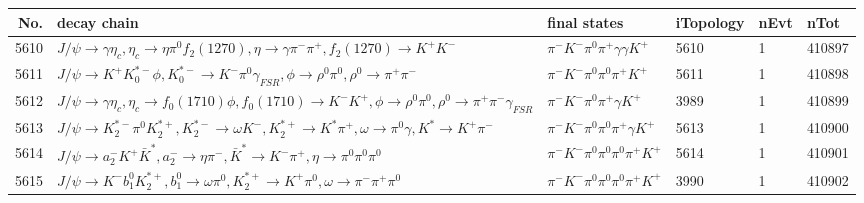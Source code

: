\begin{table}[htbp] 
\begin{center}
\begin{small}
\begin{tabular}{rlllll}\hline\hline
 No. & decay chain & final states &  iTopology & nEvt & nTot \\\hline
5610&$J/\psi       \rightarrow \gamma       \eta_{c}    , \eta_{c}     \rightarrow \eta          \pi^{0}        f_{2}(1270)    , \eta           \rightarrow \gamma       \pi^{-}        \pi^{+}        , f_{2}(1270)     \rightarrow K^{+}          K^{-}          $&$\pi^{-}        K^{-}          \pi^{0}        \pi^{+}        \gamma       \gamma       K^{+}          $& 5610&    1&410897\\
5611&$J/\psi       \rightarrow K^{+}          K_{0}^{*-}     \phi           , K_{0}^{*-}      \rightarrow K^{-}          \pi^{0}        \gamma_{FSR} , \phi            \rightarrow \rho^{0}      \pi^{0}        , \rho^{0}       \rightarrow \pi^{+}        \pi^{-}        $&$\pi^{-}        K^{-}          \pi^{0}        \pi^{0}        \pi^{+}        K^{+}          $& 5611&    1&410898\\
5612&$J/\psi       \rightarrow \gamma       \eta_{c}    , \eta_{c}     \rightarrow f_{0}(1710)    \phi           , f_{0}(1710)     \rightarrow K^{-}          K^{+}          , \phi            \rightarrow \rho^{0}      \pi^{0}        , \rho^{0}       \rightarrow \pi^{+}        \pi^{-}        \gamma_{FSR} $&$\pi^{-}        K^{-}          \pi^{0}        \pi^{+}        \gamma       K^{+}          $& 3989&    1&410899\\
5613&$J/\psi       \rightarrow K_2^{*-}       \pi^{0}        K_2^{*+}       , K_2^{*-}        \rightarrow \omega         K^{-}          , K_2^{*+}        \rightarrow K^{*}          \pi^{+}        , \omega          \rightarrow \pi^{0}        \gamma       , K^{*}           \rightarrow K^{+}          \pi^{-}        $&$\pi^{-}        K^{-}          \pi^{0}        \pi^{0}        \pi^{+}        \gamma       K^{+}          $& 5613&    1&410900\\
5614&$J/\psi       \rightarrow a_{2}^{-}      K^{+}          \bar{K}^{*}   , a_{2}^{-}       \rightarrow \eta          \pi^{-}        , \bar{K}^{*}    \rightarrow K^{-}          \pi^{+}        , \eta           \rightarrow \pi^{0}        \pi^{0}        \pi^{0}        $&$\pi^{-}        K^{-}          \pi^{0}        \pi^{0}        \pi^{0}        \pi^{+}        K^{+}          $& 5614&    1&410901\\
5615&$J/\psi       \rightarrow K^{-}          b_{1}^{0}      K_2^{*+}       , b_{1}^{0}       \rightarrow \omega         \pi^{0}        , K_2^{*+}        \rightarrow K^{+}          \pi^{0}        , \omega          \rightarrow \pi^{-}        \pi^{+}        \pi^{0}        $&$\pi^{-}        K^{-}          \pi^{0}        \pi^{0}        \pi^{0}        \pi^{+}        K^{+}          $& 3990&    1&410902\\

\end{tabular}
\end{small}
\end{center}
\end{table}
